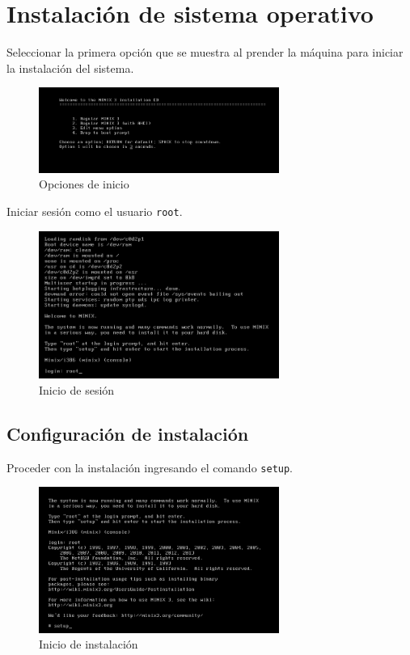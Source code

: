 \documentclass[12pt]{scrartcl}
\begin{document}
\newpage
\section{Instalación de sistema operativo}\label{instalacion}

Seleccionar la primera opción que se muestra al prender la máquina para iniciar la instalación del sistema.
\begin{figure}[H]
  \centering
  \includegraphics[width=0.7\textwidth]{vm/min15.png}
  \caption{Opciones de inicio}
\end{figure}

Iniciar sesión como el usuario \texttt{root}.
\begin{figure}[H]
  \centering
  \includegraphics[width=0.7\textwidth]{vm/min16.png}
  \caption{Inicio de sesión}
\end{figure}

\subsection{Configuración de instalación}

Proceder con la instalación ingresando el comando \texttt{setup}.
\begin{figure}[H]
  \centering
  \includegraphics[width=0.7\textwidth]{vm/min18.png}
  \caption{Inicio de instalación}
\end{figure}
\end{document}
